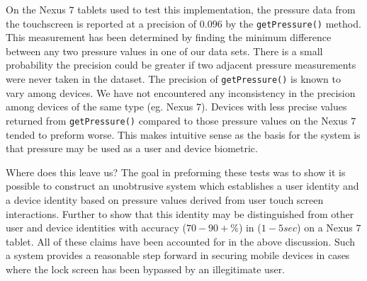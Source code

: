 On the Nexus $7$ tablets used to test this implementation,
the pressure data from the touchscreen is 
reported at a precision of $0.096$ by the {\tt getPressure()} method.
This measurement has been determined
by finding the minimum difference between
any two pressure values in one of our data sets.
%
There is a small probability the precision could
be greater if two adjacent pressure measurements
were never taken in the dataset.
%
The precision of {\tt getPressure()} is
known to vary among devices.
We have not encountered any inconsistency
in the precision among devices of the same type (eg. Nexus $7$).
%
Devices with less precise values returned from
{\tt getPressure()}
compared to those pressure values on the Nexus $7$
tended to preform worse.
%
This makes intuitive sense as the basis for the system
is that pressure may be used as a user and device biometric.

Where does this leave us?
The goal in preforming these tests was to show it is possible to construct
an 
%
unobtrusive system which 
establishes a user identity 
and a device identity
based on pressure values 
derived from user touch screen interactions.
%
Further to show that this identity may be 
distinguished from other 
user and device identities with accuracy ($70-90+\%$)
in ($1-5 sec$) on a Nexus $7$ tablet.
%
All of these claims have been accounted for
in the above discussion.
%
Such a system provides a reasonable step forward in
securing mobile devices in cases where the lock screen has
been bypassed by an illegitimate user.